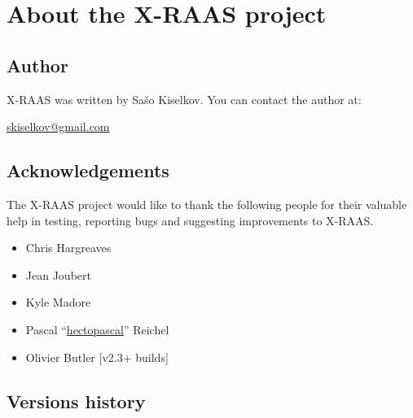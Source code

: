 \documentclass[a4paper,12pt]{article}
\begin{document}
\newpage
\section{About the X-RAAS project}
\label{sec:About}

\subsection{Author}

X-RAAS was written by Sašo Kiselkov. You can contact the author at:

\vspace{1em}

\href{mailto:skiselkov@gmail.com}{skiselkov@gmail.com}

\subsection{Acknowledgements}

The X-RAAS project would like to thank the following people for their
valuable help in testing, reporting bugs and suggesting improvements to
X-RAAS.

\begin{itemize}

\item Chris Hargreaves

\item Jean Joubert

\item Kyle Madore

\item Pascal
``\href{https://www.youtube.com/channel/UCg7RwFfTBq19oIxUkjuo_Ig}{hectopascal}''
Reichel

\item Olivier Butler [v2.3+ builds]

\end{itemize}

\subsection{Versions history}
\end{document}
